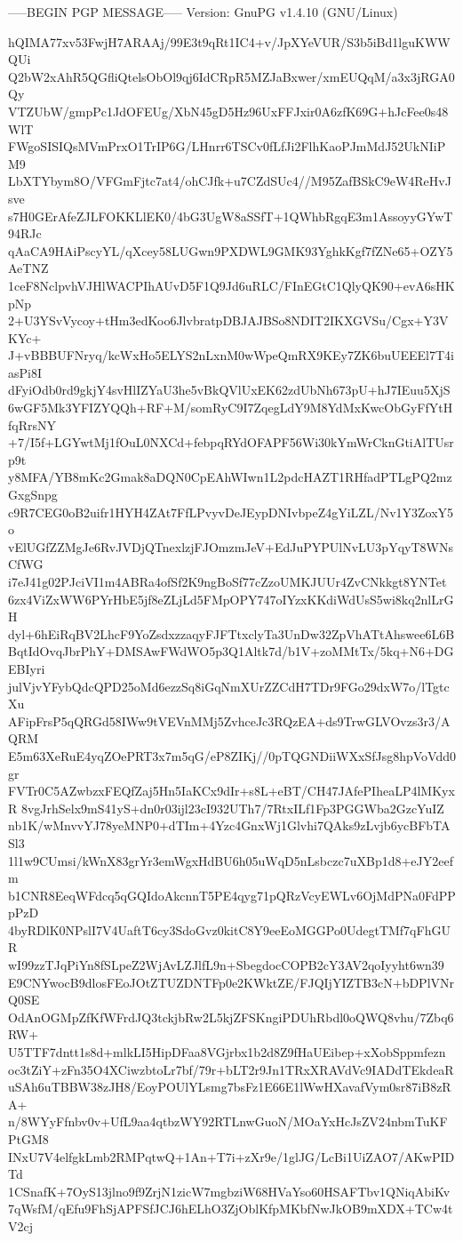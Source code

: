 -----BEGIN PGP MESSAGE-----
Version: GnuPG v1.4.10 (GNU/Linux)

hQIMA77xv53FwjH7ARAAj/99E3t9qRt1IC4+v/JpXYeVUR/S3b5iBd1lguKWWQUi
Q2bW2xAhR5QGfliQtelsObOl9qj6IdCRpR5MZJaBxwer/xmEUQqM/a3x3jRGA0Qy
VTZUbW/gmpPc1JdOFEUg/XbN45gD5Hz96UxFFJxir0A6zfK69G+hJcFee0s48WlT
FWgoSISIQsMVmPrxO1TrIP6G/LHnrr6TSCv0fLfJi2FlhKaoPJmMdJ52UkNIiPM9
LbXTYbym8O/VFGmFjtc7at4/ohCJfk+u7CZdSUc4//M95ZafBSkC9eW4ReHvJsve
s7H0GErAfeZJLFOKKLlEK0/4bG3UgW8aSSfT+1QWhbRgqE3m1AssoyyGYwT94RJc
qAaCA9HAiPscyYL/qXcey58LUGwn9PXDWL9GMK93YghkKgf7fZNe65+OZY5AeTNZ
1ceF8NclpvhVJHlWACPIhAUvD5F1Q9Jd6uRLC/FInEGtC1QlyQK90+evA6sHKpNp
2+U3YSvVycoy+tHm3edKoo6JlvbratpDBJAJBSo8NDIT2IKXGVSu/Cgx+Y3VKYc+
J+vBBBUFNryq/kcWxHo5ELYS2nLxnM0wWpeQmRX9KEy7ZK6buUEEEl7T4iasPi8I
dFyiOdb0rd9gkjY4svHlIZYaU3he5vBkQVlUxEK62zdUbNh673pU+hJ7IEuu5XjS
6wGF5Mk3YFIZYQQh+RF+M/somRyC9I7ZqegLdY9M8YdMxKwcObGyFfYtHfqRrsNY
+7/I5f+LGYwtMj1fOuL0NXCd+febpqRYdOFAPF56Wi30kYmWrCknGtiAlTUsrp9t
y8MFA/YB8mKc2Gmak8aDQN0CpEAhWIwn1L2pdcHAZT1RHfadPTLgPQ2mzGxgSnpg
c9R7CEG0oB2uifr1HYH4ZAt7FfLPvyvDeJEypDNIvbpeZ4gYiLZL/Nv1Y3ZoxY5o
vElUGfZZMgJe6RvJVDjQTnexlzjFJOmzmJeV+EdJuPYPUlNvLU3pYqyT8WNsCfWG
i7eJ41g02PJciVI1m4ABRa4ofSf2K9ngBoSf77cZzoUMKJUUr4ZvCNkkgt8YNTet
6zx4ViZxWW6PYrHbE5jf8eZLjLd5FMpOPY747oIYzxKKdiWdUsS5wi8kq2nlLrGH
dyl+6hEiRqBV2LhcF9YoZsdxzzaqyFJFTtxclyTa3UnDw32ZpVhATtAhswee6L6B
BqtIdOvqJbrPhY+DMSAwFWdWO5p3Q1Altk7d/b1V+zoMMtTx/5kq+N6+DGEBIyri
julVjvYFybQdcQPD25oMd6ezzSq8iGqNmXUrZZCdH7TDr9FGo29dxW7o/lTgtcXu
AFipFrsP5qQRGd58IWw9tVEVnMMj5ZvhceJc3RQzEA+ds9TrwGLVOvzs3r3/AQRM
E5m63XeRuE4yqZOePRT3x7m5qG/eP8ZIKj//0pTQGNDiiWXxSfJsg8hpVoVdd0gr
FVTr0C5AZwbzxFEQfZaj5Hn5IaKCx9dIr+s8L+eBT/CH47JAfePIheaLP4lMKyxR
8vgJrhSelx9mS41yS+dn0r03ijl23cI932UTh7/7RtxILf1Fp3PGGWba2GzcYuIZ
nb1K/wMnvvYJ78yeMNP0+dTIm+4Yzc4GnxWj1Glvhi7QAks9zLvjb6ycBFbTASl3
1l1w9CUmsi/kWnX83grYr3emWgxHdBU6h05uWqD5nLsbczc7uXBp1d8+eJY2eefm
b1CNR8EeqWFdcq5qGQIdoAkcnnT5PE4qyg71pQRzVcyEWLv6OjMdPNa0FdPPpPzD
4byRDlK0NPslI7V4UaftT6cy3SdoGvz0kitC8Y9eeEoMGGPo0UdegtTMf7qFhGUR
wI99zzTJqPiYn8fSLpeZ2WjAvLZJlfL9n+SbegdocCOPB2cY3AV2qoIyyht6wn39
E9CNYwocB9dlosFEoJOtZTUZDNTFp0e2KWktZE/FJQIjYIZTB3cN+bDPlVNrQ0SE
OdAnOGMpZfKfWFrdJQ3tckjbRw2L5kjZFSKngiPDUhRbdl0oQWQ8vhu/7Zbq6RW+
U5TTF7dntt1s8d+mlkLI5HipDFaa8VGjrbx1b2d8Z9fHaUEibep+xXobSppmfezn
oc3tZiY+zFn35O4XCiwzbtoLr7bf/79r+bLT2r9Jn1TRxXRAVdVc9IADdTEkdeaR
uSAh6uTBBW38zJH8/EoyPOUlYLsmg7bsFz1E66E1lWwHXavafVym0sr87iB8zRA+
n/8WYyFfnbv0v+UfL9aa4qtbzWY92RTLnwGuoN/MOaYxHcJsZV24nbmTuKFPtGM8
INxU7V4elfgkLmb2RMPqtwQ+1An+T7i+zXr9e/1glJG/LcBi1UiZAO7/AKwPIDTd
1CSnafK+7OyS13jlno9f9ZrjN1zicW7mgbziW68HVaYso60HSAFTbv1QNiqAbiKv
7qWsfM/qEfu9FhSjAPFSfJCJ6hELhO3ZjOblKfpMKbfNwJkOB9mXDX+TCw4tV2cj
